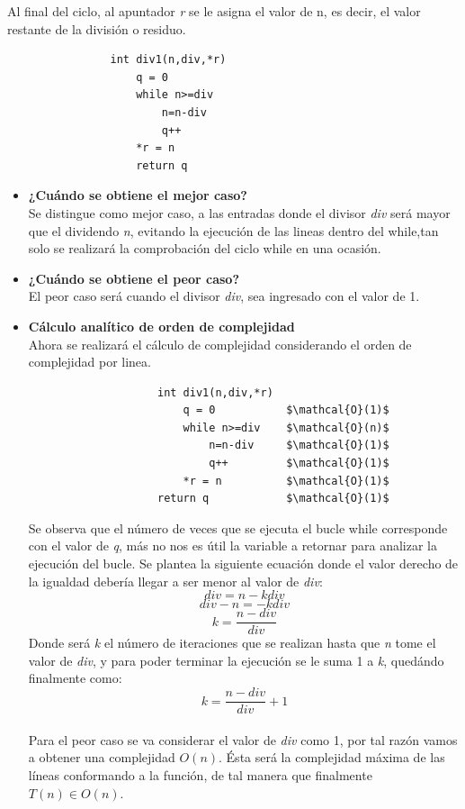 \documentclass{report}
\begin{document}
            Al final del ciclo, al apuntador \textit{r} se le asigna el valor de n, es decir, el valor restante de la división o residuo.
            \begin{verbatim}
                int div1(n,div,*r)
                    q = 0
                    while n>=div
                        n=n-div
                        q++
                    *r = n
                    return q
            \end{verbatim}
            \begin{itemize}
                \item\textbf{¿Cu\'ando se obtiene el mejor caso?}\\
                Se distingue como mejor caso, a las entradas donde el divisor \textit{div} será mayor que el dividendo \textit{n}, evitando la ejecución de las lineas dentro del while,tan solo se realizará la comprobaci\'on del ciclo while en una ocasi\'on.
                \item\textbf{¿Cu\'ando se obtiene el peor caso?}\\
                El peor caso será cuando el divisor \textit{div}, sea ingresado con el valor de 1.
                \item\textbf{C\'alculo anal\'itico de orden de complejidad}\\
                Ahora se realizar\'a el c\'alculo de complejidad considerando el orden de complejidad por linea.
                \begin{lstlisting}
                    int div1(n,div,*r)
                        q = 0           $\mathcal{O}(1)$
                        while n>=div    $\mathcal{O}(n)$
                            n=n-div     $\mathcal{O}(1)$          
                            q++         $\mathcal{O}(1)$
                        *r = n          $\mathcal{O}(1)$
                    return q            $\mathcal{O}(1)$
                \end{lstlisting}
                Se observa que el número de veces que se ejecuta el bucle while corresponde con el valor de \textit{q}, más no nos es útil la variable a retornar para analizar la ejecución del bucle. Se plantea la siguiente ecuación donde el valor derecho de la igualdad debería llegar a ser menor al valor de \textit{div}:
                $$div = n - kdiv$$
                $$div-n = -kdiv$$
                $$k=\frac{n-div}{div}$$
                Donde será \textit{k} el número de iteraciones que se realizan hasta que \textit{n} tome el valor de \textit{div}, y para poder terminar la ejecución se le suma 1 a \textit{k}, quedándo finalmente como:
                $$k = \frac{n-div}{div}+1$$\\
                Para el peor caso se va considerar el valor de \textit{div} como 1, por tal razón vamos a obtener una complejidad $O(n)$.
                Ésta será la complejidad m\'axima de las líneas conformando a la función, de tal manera que finalmente $T(n)\in O(n)$.
            \end{itemize}
            
\end{document}
